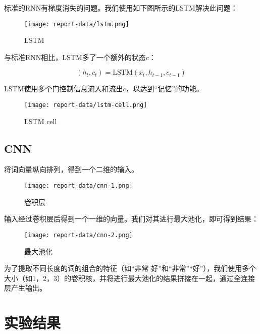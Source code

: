 \documentclass[a4paper]{article}
\begin{document}
标准的RNN有梯度消失的问题。我们使用如下图所示的LSTM解决此问题：

\begin{figure}[H]
    \centering
    \texttt{[image: report-data/lstm.png]}
    \caption{LSTM}
\end{figure}

与标准RNN相比，LSTM多了一个额外的状态$c$：

\begin{equation}
    (h_t,c_t)=\textrm{LSTM}(x_t,h_{t-1},c_{t-1})
\end{equation}

LSTM使用多个门控制信息流入和流出$c$，以达到“记忆”的功能。

\begin{figure}[H]
    \centering
    \texttt{[image: report-data/lstm-cell.png]}
    \caption{LSTM cell}
\end{figure}

\subsection{CNN}

将词向量纵向排列，得到一个二维的输入。

\begin{figure}[H]
    \centering
    \texttt{[image: report-data/cnn-1.png]}
    \caption{卷积层}
\end{figure}

输入经过卷积层后得到一个一维的向量。我们对其进行最大池化，即可得到结果：

\begin{figure}[H]
    \centering
    \texttt{[image: report-data/cnn-2.png]}
    \caption{最大池化}
\end{figure}

为了提取不同长度的词的组合的特征（如“非常 好”和“非常”“好”），我们使用多个大小（如1，2，3）的卷积核，并将进行最大池化的结果拼接在一起，通过全连接层产生输出。

\section{实验结果}
\end{document}
